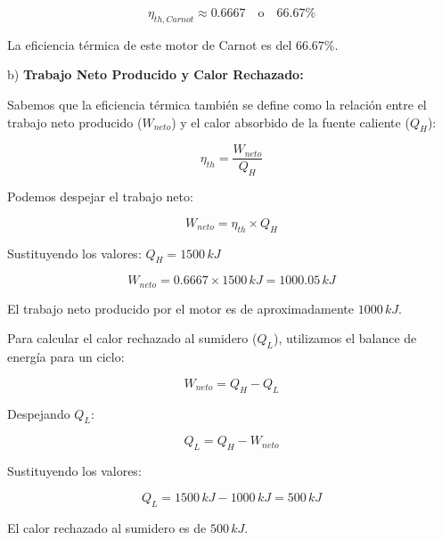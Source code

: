 \documentclass{article}
\begin{document}
$$ \eta_{th,Carnot} \approx 0.6667 \quad \text{o} \quad 66.67\% $$

La eficiencia térmica de este motor de Carnot es del $66.67\%$.

b) \textbf{Trabajo Neto Producido y Calor Rechazado:}

Sabemos que la eficiencia térmica también se define como la relación entre el trabajo neto producido ($W_{neto}$) y el calor absorbido de la fuente caliente ($Q_H$):

$$ \eta_{th} = \frac{W_{neto}}{Q_H} $$

Podemos despejar el trabajo neto:

$$ W_{neto} = \eta_{th} \times Q_H $$

Sustituyendo los valores:
$Q_H = 1500 \, kJ$

$$ W_{neto} = 0.6667 \times 1500 \, kJ = 1000.05 \, kJ $$

El trabajo neto producido por el motor es de aproximadamente $1000 \, kJ$.

Para calcular el calor rechazado al sumidero ($Q_L$), utilizamos el balance de energía para un ciclo:

$$ W_{neto} = Q_H - Q_L $$

Despejando $Q_L$:

$$ Q_L = Q_H - W_{neto} $$

Sustituyendo los valores:

$$ Q_L = 1500 \, kJ - 1000 \, kJ = 500 \, kJ $$

El calor rechazado al sumidero es de $500 \, kJ$.
\end{document}
